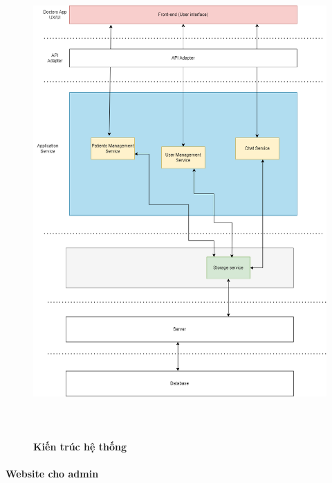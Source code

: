 \begin{figure}[H]
  \centering
  \includegraphics[width=16cm,height=18cm]{Images/system/fmECG_architecture-Doctors.drawio.png}
  \caption[Kiến trúc hệ thống]{\bfseries \fontsize{12pt}{0pt}\selectfont Kiến trúc hệ thống}
  \label{hinh15} %
\end{figure}


\paragraph{Website cho admin}
\mbox{}

